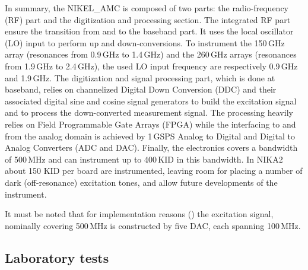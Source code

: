 \documentclass[]{aa} %
\begin{document}
In summary, the NIKEL\_AMC is composed of two parts: the radio-frequency (RF) part and the digitization and processing section.
The integrated RF part ensure the transition from and to the baseband part.
It uses the local oscillator (LO) input to perform up and down-conversions.
To instrument the 150\,GHz array (resonances from 0.9\,GHz to 1.4\,GHz) and the 260\,GHz arrays (resonances from 1.9\,GHz to 2.4\,GHz), the used LO input frequency are respectively 0.9\,GHz and 1.9\,GHz. The digitization and signal processing part, which is done at baseband, relies on channelized Digital Down Conversion (DDC) and their associated digital sine and cosine signal generators to build the excitation signal and to process the down-converted measurement signal.
The processing heavily relies on Field Programmable Gate Arrays (FPGA) while the interfacing to and from the analog domain is achieved by 1\,GSPS Analog to Digital and Digital to Analog Converters (ADC and DAC).
Finally, the electronics covers a bandwidth of 500\,MHz and can instrument up to 400\,KID in this bandwidth. In NIKA2 about 150 KID per board are instrumented, leaving room for placing a number of dark (off-resonance) excitation tones, and allow future developments of the instrument. 

It must be noted that for implementation reasons (\cite{Bourrion2012,Bourrion2016}) the excitation signal, nominally covering 500\,MHz is constructed by five DAC, each spanning 100\,MHz.



\subsection{Laboratory tests}
\label{Laboratory tests}
\end{document}

